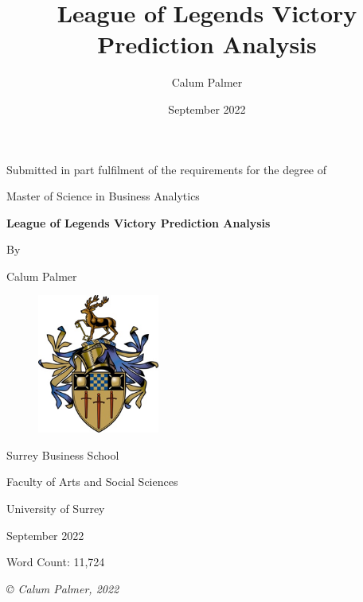 \documentclass[12pt,a4 paper]{report}
\title{League of Legends Victory Prediction Analysis}
\author{Calum Palmer}
\date{September 2022}
\begin{document}
    \begin{titlepage}
    \centering
        {\large Submitted in part fulfilment of the requirements for the degree of}


        {\Large Master of Science in Business Analytics}

    \vspace{1.5cm}
        {\huge\bfseries League of Legends Victory Prediction Analysis}

    \vspace{1cm}
        {By}

    \vspace{0.5cm}
        {\Large Calum Palmer}

    \vspace{0.25cm}
    \begin{figure}[h]
        \centering
        \includegraphics[width=4cm]{figures/SurreyCrest}
    \end{figure}

    \vspace{0.25cm}
        {\large Surrey Business School}

    \vspace{0.25cm}
        {\large Faculty of Arts and Social Sciences}

    \vspace{0.25cm}
        {\large University of Surrey}

    \vspace{1cm}
        {\large September 2022}

    \vspace{1cm}
        {\large Word Count: 11,724}

    \vfill
        {\itshape © Calum Palmer, 2022}

    \end{titlepage}

    \setcounter{page}{2}
\end{document}
